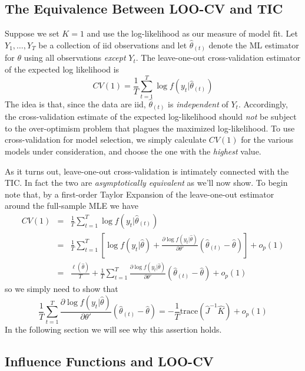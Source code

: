 \subsection{The Equivalence Between LOO-CV and TIC}
Suppose we set $K=1$ and use the log-likelihood as our measure of model fit.
Let $Y_1, \hdots, Y_T$ be a collection of iid observations and let $\widehat{\theta}_{(t)}$ denote the ML estimator for $\theta$ using all observations \emph{except} $Y_t$. 
The leave-one-out cross-validation estimator of the expected log likelihood is
	$$CV(1) = \frac{1}{T} \sum_{t=1}^T \log f(y_t|\widehat{\theta}_{(t)})$$
The idea is that, since the data are iid, $\widehat{\theta}_{(t)}$ is \emph{independent} of $Y_t$. Accordingly, the cross-validation estimate of the expected log-likelihood should \emph{not} be subject to the over-optimism problem that plagues the maximized log-likelihood. To use cross-validation for model selection, we simply calculate $CV(1)$ for the various models under consideration, and choose the one with the \emph{highest} value.

As it turns out, leave-one-out cross-validation is intimately connected with the TIC. In fact the two are \emph{asymptotically equivalent} as we'll now show. To begin note that, by a first-order Taylor Expansion of the leave-one-out estimator around the full-sample MLE we have
	\begin{eqnarray*}
		CV(1) &=& \frac{1}{T} \sum_{t=1}^T \log f(y_t|\widehat{\theta}_{(t)})\\
			&=&\frac{1}{T} \sum_{t=1}^T \left[\log f(y_t|\widehat{\theta}) + \frac{\partial \log f(y_t|\widehat{\theta})}{\partial \theta'}\left(\widehat{\theta}_{(t)} - \widehat{\theta} \right) \right] + o_p(1)\\
			&=& \frac{\ell(\widehat{\theta})}{T} + \frac{1}{T}\sum_{t=1}^T \frac{\partial \log f(y_t|\widehat{\theta})}{\partial \theta'}\left(\widehat{\theta}_{(t)} - \widehat{\theta} \right) + o_p(1)
	\end{eqnarray*}
so we simply need to show that
	$$\frac{1}{T}\sum_{t=1}^T \frac{\partial \log f(y_t|\widehat{\theta})}{\partial \theta'}\left(\widehat{\theta}_{(t)} - \widehat{\theta} \right) = -\frac{1}{T}\mbox{trace}\left(\widehat{J}^{-1} \widehat{K} \right) + o_p(1)$$
In the following section we will see why this assertion holds.

\subsection{Influence Functions and LOO-CV}

